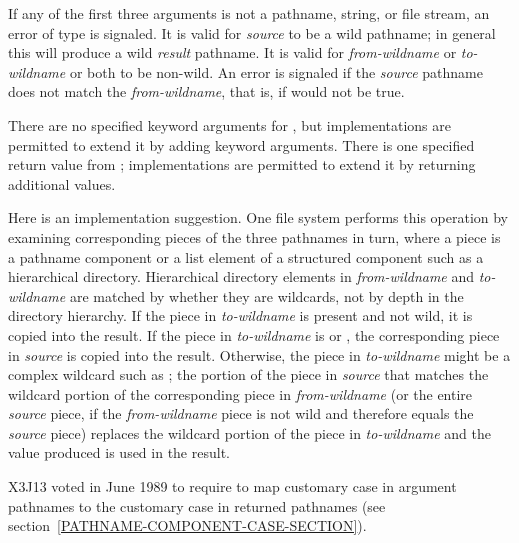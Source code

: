 \begin{defun}[Function]
If any of the first three arguments is not a pathname, string, or file stream,
an error of type  is signaled.  It is valid for \emph{source} to
be a wild pathname; in general this will produce a wild \emph{result} pathname.
It is valid for \emph{from-wildname} or \emph{to-wildname} or both to be
non-wild.  An error is signaled if the \emph{source} pathname does not match the
\emph{from-wildname}, that is, if  would not be true.
    
There are no specified keyword arguments for , but
implementations are permitted to extend it by adding keyword arguments.  There
is one specified return value from ; implementations are
permitted to extend it by returning additional values.

Here is an implementation suggestion.  One file system performs this operation
by examining corresponding pieces of the three pathnames in turn, where a piece
is a pathname component or a list element of a structured component such as a
hierarchical directory.  Hierarchical directory elements in \emph{from-wildname}
and \emph{to-wildname} are matched by whether they are wildcards, not by depth
in the directory hierarchy.  If the piece in \emph{to-wildname} is present and
not wild, it is copied into the result.  If the piece in \emph{to-wildname} is
 or , the corresponding piece in \emph{source} is copied into
the result.  Otherwise, the piece in \emph{to-wildname} might be a complex
wildcard such as ; the portion of the piece in \emph{source} that
matches the wildcard portion of the corresponding piece in \emph{from-wildname}
(or the entire \emph{source} piece, if the \emph{from-wildname} piece is not
wild and therefore equals the \emph{source} piece) replaces the wildcard portion
of the piece in \emph{to-wildname} and the value produced is used in the result.

X3J13 voted in June 1989  to
require  to map customary case in argument
pathnames to the customary case in returned pathnames
(see section~\ref{PATHNAME-COMPONENT-CASE-SECTION}).


\end{defun}
